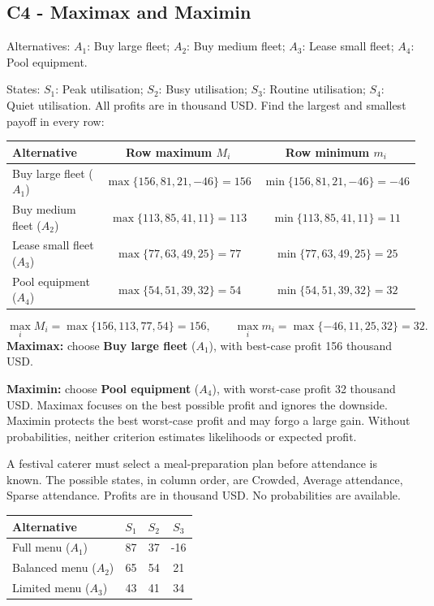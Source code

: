 \subsection*{C4 - Maximax and Maximin }
\label{sol:equipment-leasing-c4}
Alternatives: $A_1$: Buy large fleet; $A_2$: Buy medium fleet; $A_3$: Lease small fleet; $A_4$: Pool equipment.\par
States: $S_1$: Peak utilisation; $S_2$: Busy utilisation; $S_3$: Routine utilisation; $S_4$: Quiet utilisation.
All profits are in thousand USD. Find the largest and smallest payoff in every row:
\begin{center}
\begin{tabular}{@{}lcc@{}}\toprule
Alternative & Row maximum $M_i$ & Row minimum $m_i$\\\midrule
Buy large fleet ($A_1$) & $\max\{156,81,21,-46\}=156$ & $\min\{156,81,21,-46\}=-46$\\
Buy medium fleet ($A_2$) & $\max\{113,85,41,11\}=113$ & $\min\{113,85,41,11\}=11$\\
Lease small fleet ($A_3$) & $\max\{77,63,49,25\}=77$ & $\min\{77,63,49,25\}=25$\\
Pool equipment ($A_4$) & $\max\{54,51,39,32\}=54$ & $\min\{54,51,39,32\}=32$\\
\bottomrule\end{tabular}
\end{center}
\[\max_i M_i=\max\{156,113,77,54\}=156,\qquad \max_i m_i=\max\{-46,11,25,32\}=32.\]
\textbf{Maximax:} choose \textbf{Buy large fleet} ($A_1$), with best-case profit 156 thousand USD.\par
\textbf{Maximin:} choose \textbf{Pool equipment} ($A_4$), with worst-case profit 32 thousand USD.
Maximax focuses on the best possible profit and ignores the downside. Maximin protects the best worst-case profit and may forgo a large gain. Without probabilities, neither criterion estimates likelihoods or expected profit.
\par\vspace{4mm}

\clearpage
{}
A festival caterer must select a meal-preparation plan before attendance is known. The possible states, in column order, are Crowded, Average attendance, Sparse attendance. Profits are in thousand USD. No probabilities are available.
\begin{center}
\begin{tabular}{@{}lccc@{}}\toprule
Alternative & $S_1$ & $S_2$ & $S_3$\\\midrule
Full menu ($A_1$) & 87 & 37 & -16\\
Balanced menu ($A_2$) & 65 & 54 & 21\\
Limited menu ($A_3$) & 43 & 41 & 34\\
\bottomrule\end{tabular}
\end{center}
